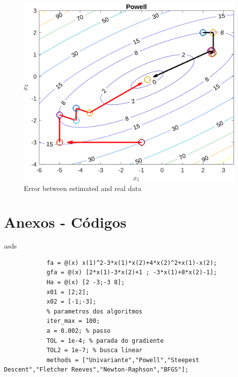 \documentclass[10pt, a4paper]{article}
\begin{document}
\begin{figure}[H]
      \centering
      \includegraphics[width=\textwidth]{img01A_m02.png}
      \caption{Error between estimated and real data}
      \label{fig:e}
\end{figure}

\section{Anexos - C\'odigos}

asds


\begin{minipage}{\linewidth}
      \begin{lstlisting}[style=myStyle, caption=script t01.m setando par\^ametros e criando as fun\c c\~oes, label=l1]
            % dados do item 01a, f, grad f, hess f e x0
            fa = @(x) x(1)^2-3*x(1)*x(2)+4*x(2)^2+x(1)-x(2);
            gfa = @(x) [2*x(1)-3*x(2)+1 ; -3*x(1)+8*x(2)-1];
            Ha = @(x) [2 -3;-3 8];
            x01 = [2;2];
            x02 = [-1;-3];
            % parametros dos algoritmos
            iter_max = 100;
            a = 0.002; % passo
            TOL = 1e-4; % parada do gradiente
            TOL2 = 1e-7; % busca linear
            methods = ["Univariante","Powell","Steepest Descent","Fletcher Reeves","Newton-Raphson","BFGS"];
      \end{lstlisting}
\end{minipage}
\end{document}

